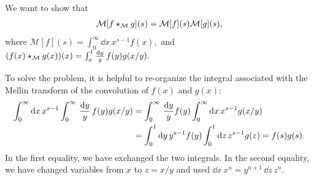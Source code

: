 





We want to show that
\begin{align}
    \mathcal M[f \star_{\mathcal M} g](s) = \mathcal M[f](s) \mathcal M[g](s)
    ,
\end{align}
where
\(
    \mathcal{M}[f](s) = \int_0^\infty \dd x\, x^{s-1} f(x)
    ,
\)
and
\(
    (f(x) \star_{\mathcal M} g(x))(x)
    =
    \int_x^1 \frac{\dd y}{y}\, f(y) g(x/y)
    .
\)

To solve the problem, it is helpful to re-organize the integral associated with the Mellin transform of the convolution of \(f(x)\) and \(g(x)\):
\begin{align}
    \int_0^\infty \dd x\, x^{s-1}
    \int_0^\infty \,\frac{\dd y}{y}\,
    f(y) g(x/y)
    &=
    \int_0^\infty \,\frac{\dd y}{y}
    f(y)
    \int_0^\infty \dd x\,
    x^{s-1} g(x/y)
    \\
    \notag
    &=
    \int_0^1 \dd y \, y^{s-1} f(y)
    \int_0^1 \dd z\, z^{s-1} g(z)
    =
    f(s) g(s)
    .
\end{align}
In the first equality, we have exchanged the two integrals. %
%
In the second equality, we have changed variables from \(x\) to \(z = x/y\) and used \(\dd x\, x^n = y^{n+1}\, \dd z\, z^n\).

